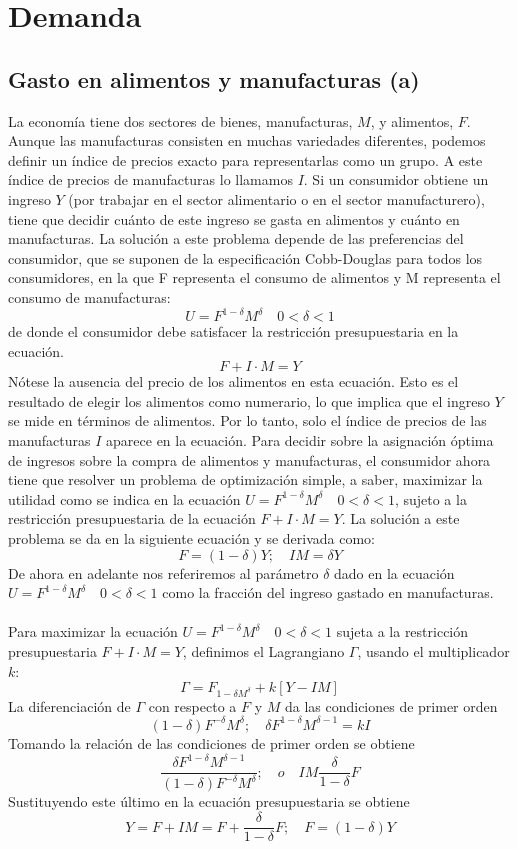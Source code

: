 \section{Demanda}
\subsection{Gasto en alimentos y manufacturas (a)}
La economía tiene dos sectores de bienes, manufacturas, $M$, y alimentos, $F$. Aunque las manufacturas consisten en muchas variedades diferentes, podemos definir un índice de precios exacto para representarlas como un grupo. A este índice de precios de manufacturas lo llamamos $I$. Si un consumidor obtiene un ingreso $Y$ (por trabajar en el sector alimentario o en el sector manufacturero), tiene que decidir cuánto de este ingreso se gasta en alimentos y cuánto en manufacturas. La solución a este problema depende de las preferencias del consumidor, que se suponen de la especificación Cobb-Douglas para todos los consumidores, en la que F representa el consumo de alimentos y M representa el consumo de manufacturas:
$$U=F^{1-\delta}M^\delta\quad 0<\delta<1$$
de donde el consumidor debe satisfacer la restricción presupuestaria en la ecuación.
$$F+I\cdot M = Y$$
Nótese la ausencia del precio de los alimentos en esta ecuación. Esto es el resultado de elegir los alimentos como numerario, lo que implica que el ingreso $Y$ se mide en términos de alimentos. Por lo tanto, solo el índice de precios de las manufacturas $I$ aparece en la ecuación. Para decidir sobre la asignación óptima de ingresos sobre la compra de alimentos y manufacturas, el consumidor ahora tiene que resolver un problema de optimización simple, a saber, maximizar la utilidad como se indica en la ecuación $U=F^{1-\delta}M^\delta\quad 0<\delta<1$, sujeto a la restricción presupuestaria de la ecuación $F+I\cdot M = Y$. La solución a este problema se da en la siguiente ecuación y se derivada como:
$$F=(1-\delta)Y;\quad IM=\delta Y$$
De ahora en adelante nos referiremos al parámetro $\delta$ dado en la ecuación $U=F^{1-\delta}M^\delta\quad 0<\delta<1$ como la fracción del ingreso gastado en manufacturas.\\\\

Para maximizar la ecuación $U=F^{1-\delta}M^\delta\quad 0<\delta<1$ sujeta a la restricción presupuestaria 
$F+I\cdot M = Y$, definimos el Lagrangiano $\Gamma$, usando el multiplicador $k$:
$$\Gamma = F_{1-\delta M^{\delta}}+k[Y-IM]$$
La diferenciación de $\Gamma$ con respecto a $F$ y $M$ da las condiciones de primer orden
$$(1-\delta)F^{-\delta}M^{\delta};\quad \delta F^{1-\delta}M^{\delta-1} = kI$$
Tomando la relación de las condiciones de primer orden se obtiene
$$\dfrac{\delta F^{1-\delta} M^{\delta-1}}{(1-\delta)F^{-\delta} M^{\delta}}; \quad o \quad IM\dfrac{\delta}{1-\delta}F$$
Sustituyendo este último en la ecuación presupuestaria se obtiene
$$Y=F+IM=F+\dfrac{\delta}{1-\delta}F;\quad F=(1-\delta)Y$$


